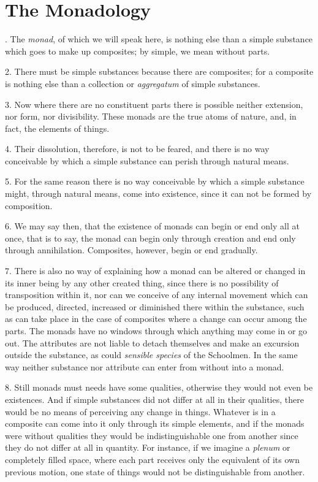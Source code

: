 
\author{G. W. Leibniz}
\chapter{The Monadology}


. The \textit{monad}, of which we will speak
here, is nothing else than a simple substance which goes to make up
composites; by simple, we mean without parts.

2. There must be simple substances because there are composites; for a
composite is nothing else than a collection or \textit{aggregatum} of
simple substances.

3. Now where there are no constituent parts there is possible neither
extension, nor form, nor divisibility. These monads are the true atoms
of nature, and, in fact, the elements of things.

4. Their dissolution, therefore, is not to be feared, and there is no
way conceivable by which a simple substance can perish through natural
means.

5. For the same reason there is no way conceivable by which a simple
substance might, through natural means, come into existence, since it
can not be formed by composition.


6. We may say then, that the existence of monads can begin or end only
all at once, that is to say, the monad can begin only through creation
and end only through annihilation. Composites, however, begin or end
gradually.

7. There is also no way of explaining how a monad can be altered or
changed in its inner being by any  other created thing,
since there is no possibility of transposition within it, nor can we
conceive of any internal movement which can be produced, directed,
increased or diminished there within the substance, such as can take
place in the case of composites where a change can occur among the
parts. The monads have no windows through which anything may come in
or go out. The attributes are not liable to detach themselves and make
an excursion outside the substance, as could \textit{sensible species}
of the Schoolmen. In the same way neither substance nor attribute can
enter from without into a monad.

8. Still monads must needs have some qualities, otherwise they would
not even be existences. And if simple substances did not differ at all
in their qualities, there would be no means of perceiving any change
in things. Whatever is in a composite can come into it only through
its simple elements, and if the monads were without qualities they would be
indistinguishable one from another since they do not differ at all in
quantity. For instance, if we imagine a \textit{plenum} or completely
filled space, where each part receives only the equivalent of its own
previous motion, one state of things would not be distinguishable from
another.

